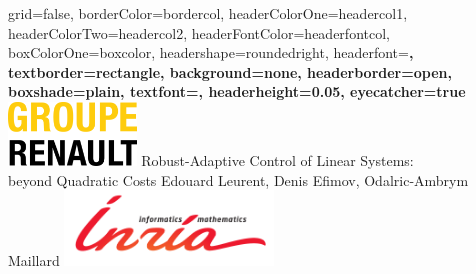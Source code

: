 \documentclass[paperwidth=36in,paperheight=48in,portrait,fontscale=0.355, margin=2cm]{baposter}
\begin{document}
\begin{poster}{
grid=false,
borderColor=bordercol, %
headerColorOne=headercol1, %
headerColorTwo=headercol2, %
headerFontColor=headerfontcol, %
boxColorOne=boxcolor, %
headershape=roundedright, %
headerfont=\Large\bf\textsc, %
textborder=rectangle,
background=none,
headerborder=open, %
boxshade=plain,
textfont={\setlength{\parindent}{0.0em}\sffamily},
headerheight={0.05\textheight},
eyecatcher=true
}
%
%
{
\includegraphics[height=1.7cm]{./img/companies}
}
{
Robust-Adaptive Control of Linear Systems:\\beyond Quadratic Costs
}
{
Edouard Leurent, Denis Efimov, Odalric-Ambrym Maillard
\vspace{-3\baselineskip}
}
{
\includegraphics[height=2cm]{./img/inria_sc}
}

\setlength{\colheight}{0.92\textheight}



\end{poster}
\end{document}
